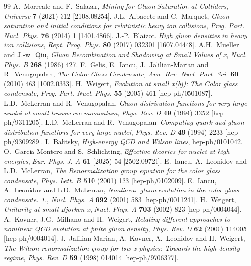 \begin{thebibliography}{99}
\small
{} A.~Morreale and F.~Salazar, \emph{Mining for Gluon Saturation at Colliders}, \emph{Universe} \textbf{7} (2021) 312 [2108.08254].
 J.L.~Albacete and C.~Marquet, \emph{Gluon saturation and initial conditions for relativistic heavy ion collisions}, \emph{Prog. Part. Nucl. Phys.} \textbf{76} (2014) 1 [1401.4866].
 J.-P.~Blaizot, \emph{High gluon densities in heavy ion collisions}, \emph{Rept. Prog. Phys.} \textbf{80} (2017) 032301 [1607.04448].
 A.H.~Mueller and J.-w.~Qiu, \emph{Gluon Recombination and Shadowing at Small Values of x}, \emph{Nucl. Phys. B} \textbf{268} (1986) 427.
 F.~Gelis, E.~Iancu, J.~Jalilian-Marian and R.~Venugopalan, \emph{The Color Glass Condensate}, \emph{Ann. Rev. Nucl. Part. Sci.} \textbf{60} (2010) 463 [1002.0333].
 H.~Weigert, \emph{Evolution at small x(bj): The Color glass condensate}, \emph{Prog. Part. Nucl. Phys.} \textbf{55} (2005) 461 [hep-ph/0501087].
 L.D.~McLerran and R.~Venugopalan, \emph{Gluon distribution functions for very large nuclei at small transverse momentum}, \emph{Phys. Rev. D} \textbf{49} (1994) 3352 [hep-ph/9311205].
 L.D.~McLerran and R.~Venugopalan, \emph{Computing quark and gluon distribution functions for very large nuclei}, \emph{Phys. Rev. D} \textbf{49} (1994) 2233 [hep-ph/9309289].
 I.~Balitsky, \emph{High-energy QCD and Wilson lines}, hep-ph/0101042.
 O.~Garcia-Montero and S.~Schlichting, \emph{Effective theories for nuclei at high energies}, \emph{Eur. Phys. J. A} \textbf{61} (2025) 54 [2502.09721].
 E.~Iancu, A.~Leonidov and L.D.~McLerran, \emph{The Renormalization group equation for the color glass condensate}, \emph{Phys. Lett. B} \textbf{510} (2001) 133 [hep-ph/0102009].
 E.~Iancu, A.~Leonidov and L.D.~McLerran, \emph{Nonlinear gluon evolution in the color glass condensate. 1.}, \emph{Nucl. Phys. A} \textbf{692} (2001) 583 [hep-ph/0011241].
 H.~Weigert, \emph{Unitarity at small Bjorken x}, \emph{Nucl. Phys. A} \textbf{703} (2002) 823 [hep-ph/0004044].
 A.~Kovner, J.G.~Milhano and H.~Weigert, \emph{Relating different approaches to nonlinear QCD evolution at finite gluon density}, \emph{Phys. Rev. D} \textbf{62} (2000) 114005 [hep-ph/0004014].
 J.~Jalilian-Marian, A.~Kovner, A.~Leonidov and H.~Weigert, \emph{The Wilson renormalization group for low x physics: Towards the high density regime}, \emph{Phys. Rev. D} \textbf{59} (1998) 014014 [hep-ph/9706377].

\end{thebibliography}
